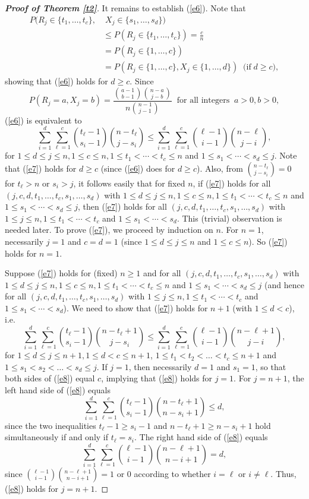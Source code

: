\documentclass[12pt, A4paper, oneside]{article}
\theoremstyle{plain}
\numberwithin{equation}{section}
\begin{document}
\begin{proof}[\bf Proof of Theorem \ref{t2}]
It remains to establish  (\ref{e6}). Note that
\begin{align*}
P(R_j \in \{t_1,\dots, t_c\}, & \; X_j \in \{s_1,\dots,s_d\})\\
& \le P(R_j \in \{t_1,\dots, t_c\})=\frac{c}{n}\\
&=P(R_j \in \{1,\dots,c\})\\
&=P(R_j \in \{1,\dots,c\}, X_j \in \{1,\dots,d\})\;\;\mbox{(if}\; d\ge c),
\end{align*}
showing that (\ref{e6}) holds for $d\ge c$.
Since
$$
P(R_j=a,X_j=b)=\frac{{a-1\choose b-1}{n-a\choose j-b}}{n{n-1\choose j-1}}\;\;\mbox{for all integers}\;\;a>0, b>0,
$$
(\ref{e6}) is equivalent to
\begin{equation}\label{e7}
\sum_{i=1}^d\sum_{\ell=1}^c{t_\ell-1\choose s_i-1}{n-t_\ell\choose j-s_i}\le\sum_{i=1}^d\sum_{\ell=1}^c{\ell-1\choose i-1}{n-\ell\choose j-i},
\end{equation}
for $1\le d\le j \le n, 1\le c\le n, 1\le t_1<\cdots<t_c\le n$ and $1\le s_1<\cdots<s_d\le j$.
Note that (\ref{e7}) holds for $d \ge c$ (since (\ref{e6})  does for $d\ge c$).
Also, from ${n-t_\ell\choose j-s_i}=0$ for $t_\ell>n$ or $s_i> j$, it follows easily that for fixed $n$, if (\ref{e7}) holds for all
$(j,c,d, t_1,\dots, t_c, s_1,
\dots,s_d)$ with
 $1\le d\le j \le n, 1\le c\le n, 1\le t_1<\cdots<t_c\le n$ and $1\le s_1<\cdots<s_d\le j$, then (\ref{e7}) holds for all
 $(j,c,d,t_1,\dots,t_c,s_1,\dots,s_d)$ with $1\le j \le n, 1\le t_1<\cdots<t_c$ and $1\le s_1<\cdots<s_d$. This (trivial) observation is needed later.
  To prove (\ref{e7}),  we proceed by induction on $n$. For $n=1$, necessarily $j=1$ and $c=d=1$ (since $1\le d\le j\le n$
and $1\le c\le n$). So (\ref{e7}) holds for $n=1$.


Suppose (\ref{e7}) holds for (fixed) $n\ge1$ and for all $(j,c,d,t_1,\dots,t_c,s_1,\dots,s_d)$ with $1\le d\le j \le n, 1\le c\le n, 1\le t_1<\cdots<t_c\le n$ and $1\le s_1<\cdots<s_d\le j$ (and hence
for all $(j,c,d,t_1,\dots,t_c,s_1,\dots,s_d)$ with
$1\le j \le n, 1\le t_1<\cdots<t_c$ and $1\le s_1<\cdots<s_d$).
We need to show that (\ref{e7}) holds for $n+1$ (with $1\le d<c$), i.e.
\begin{equation}\label{e8}
\sum_{i=1}^d\sum_{\ell=1}^c{t_\ell-1\choose s_i-1}{n-t_\ell+1\choose j-s_i}\le\sum_{i=1}^d\sum_{\ell=1}^c{\ell-1\choose i-1}{n-\ell+1\choose j-i},
\end{equation}
for $1\le d \le j\le n+1, 1\le d < c \le n+1$, $1\le t_1<t_2<\dots<t_c\le n+1$ and $1\le s_1<s_2<\dots<s_d\le j$. If $j=1$, then
necessarily $d=1$ and $s_1=1$, so that both sides of (\ref{e8}) equal $c$, implying that   (\ref{e8}) holds for $j=1$. For $j=n+1$, the left hand side of (\ref{e8}) equals
$$
\sum_{i=1}^d\sum_{\ell=1}^c{t_\ell-1\choose s_i-1}{n-t_\ell+1\choose n-s_i+1}\le d,
$$
since the two inequalities $t_\ell-1\ge s_i-1$  and $n-t_\ell+1\ge n-s_i+1$  hold simultaneously if and only if $t_\ell=s_i$.
 The right hand side of (\ref{e8}) equals
$$
\sum_{i=1}^d\sum_{\ell=1}^c{\ell-1\choose i-1}{n-\ell+1\choose n-i+1}=d,
$$
since ${\ell-1\choose i-1}{n-\ell+1\choose n-i+1}=1$ or $0$ according to whether $i=\ell$ or $i \ne \ell$.
Thus, (\ref{e8}) holds for $j=n+1$.


\end{proof}
\end{document}
